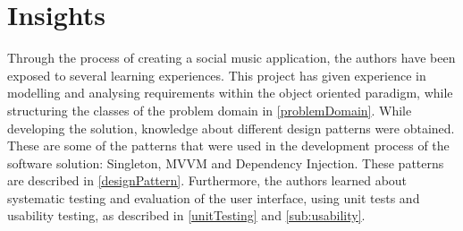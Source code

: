 \chapter{Insights}
\label{cha:perspectivation}

Through the process of creating a social music application, the authors have been exposed to several learning experiences. This project has given experience in modelling and analysing requirements within the object oriented paradigm, while structuring the classes of the problem domain in \cref{problemDomain}.
While developing the solution, knowledge about different design patterns were obtained. These are some of the patterns that were used in the development process of the software solution: Singleton, MVVM and Dependency Injection. These patterns are described in \cref{designPattern}. 
Furthermore, the authors learned about systematic testing and evaluation of the user interface, using unit tests and usability testing, as described in \cref{unitTesting} and \cref{sub:usability}. 
